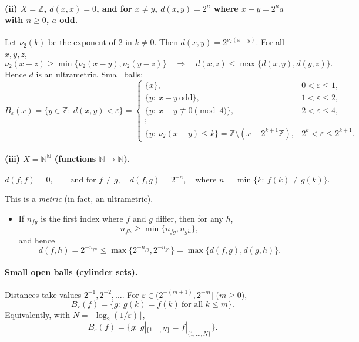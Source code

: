 \documentclass[12pt,a4paper]{article}
\theoremstyle{plain}
\theoremstyle{definition}
\theoremstyle{remark}
\theoremstyle{remark}
\begin{document}
\paragraph{(ii) $X=\mathbb{Z}$, $d(x,x)=0$, and for $x\neq y$, $d(x,y)=2^{n}$ where $x-y=2^{n}a$ with $n\ge0$, $a$ odd.}
Let $\nu_2(k)$ be the exponent of $2$ in $k\neq0$. Then $d(x,y)=2^{\nu_2(x-y)}$.
For all $x,y,z$,
\[
\nu_2(x-z)\ge \min\{\nu_2(x-y),\nu_2(y-z)\}\quad\Rightarrow\quad
d(x,z)\le \max\{d(x,y),d(y,z)\}.
\]
Hence $d$ is an ultrametric. Small balls:
\[
B_\varepsilon(x)=\{y\in\mathbb Z:\ d(x,y)<\varepsilon\}=
\begin{cases}
	\{x\}, & 0<\varepsilon\le 1,\\[2mm]
	\{y:\ x-y\ \text{odd}\}, & 1<\varepsilon\le 2,\\[1mm]
	\{y:\ x-y\not\equiv 0\pmod{4}\}, & 2<\varepsilon\le 4,\\[1mm]
	\vdots\\
	\{y:\ \nu_2(x-y)\le k\}=\mathbb Z\setminus (x+2^{k+1}\mathbb Z), & 2^{k}<\varepsilon\le 2^{k+1}.
\end{cases}
\]

\paragraph{(iii) $X=\mathbb{N}^{\mathbb{N}}$ (functions $\mathbb{N}\to\mathbb{N}$).}
\[
d(f,f)=0,\qquad
\text{and for } f\neq g,\quad d(f,g)=2^{-n},
\quad \text{where } n=\min\{k:\ f(k)\neq g(k)\}.
\]

This is a \emph{metric} (in fact, an ultrametric).

\begin{itemize}
	\item If $n_{fg}$ is the first index where $f$ and $g$ differ, then for any $h$,
	\[
	n_{fh}\ge \min\{n_{fg},n_{gh}\},
	\]
	and hence
	\[
	d(f,h)=2^{-n_{fh}}\le \max\{2^{-n_{fg}},2^{-n_{gh}}\}
	=\max\{d(f,g),d(g,h)\}.
	\]
\end{itemize}

\noindent\hrulefill

\paragraph{Small open balls (cylinder sets).}
Distances take values $2^{-1},2^{-2},\dots$.
For $\varepsilon\in(2^{-(m+1)},2^{-m}]$ ($m\ge0$),
\[
B_\varepsilon(f)=\{g:\ g(k)=f(k)\ \text{for all } k\le m\}.
\]
Equivalently, with $N=\lfloor\log_2(1/\varepsilon)\rfloor$,
\[
B_\varepsilon(f)=\{g:\ g|_{\{1,\dots,N\}}=f|_{\{1,\dots,N\}}\}.
\]
\end{document}
